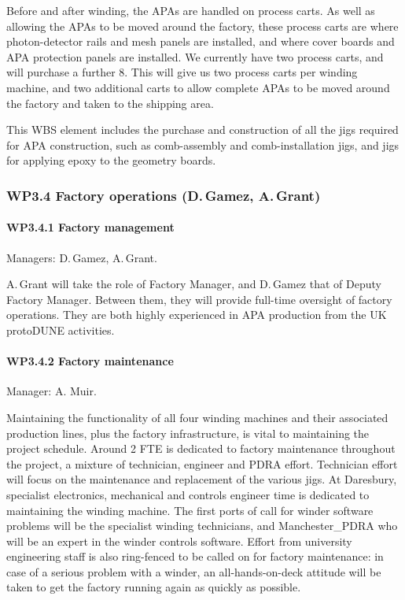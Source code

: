 Before and after winding, the APAs are handled on process carts. As well as allowing the APAs to be moved around the factory, these process carts are where photon-detector rails and mesh panels are installed, and where cover boards and APA protection panels are installed. We currently have two process carts, and will purchase a further 8. This will give us two process carts per winding machine, and two additional carts to allow complete APAs to be moved around the factory and taken to the shipping area.

This WBS element includes the purchase and construction of all the jigs required for APA construction, such as comb-assembly and comb-installation jigs, and jigs for applying epoxy to the geometry boards.

\subsubsection{WP3.4 Factory operations (D.\,Gamez, A.\,Grant)}

\paragraph{WP3.4.1 Factory management} Managers: D.\,Gamez, A.\,Grant.

A.\,Grant will take the role of Factory Manager, and D.\,Gamez that of Deputy Factory Manager. Between them, they will provide full-time oversight of factory operations. They are both highly experienced in APA production from the UK protoDUNE activities.

\paragraph{WP3.4.2 Factory maintenance} Manager: A. Muir.

Maintaining the functionality of all four winding machines and their associated production lines, plus the factory infrastructure, is vital to maintaining the project schedule. Around 2 FTE is dedicated to factory maintenance throughout the project, a mixture of technician, engineer and PDRA effort. Technician effort will focus on the maintenance and replacement of the various jigs. At Daresbury, specialist electronics, mechanical and controls engineer time is dedicated to maintaining the winding machine. The first ports of call for winder software problems will be the specialist winding technicians, and Manchester\_PDRA who will be an expert in the winder controls software. Effort from university engineering staff is also ring-fenced to be called on for factory maintenance: in case of a serious problem with a winder, an all-hands-on-deck attitude will be taken to get the factory running again as quickly as possible.

